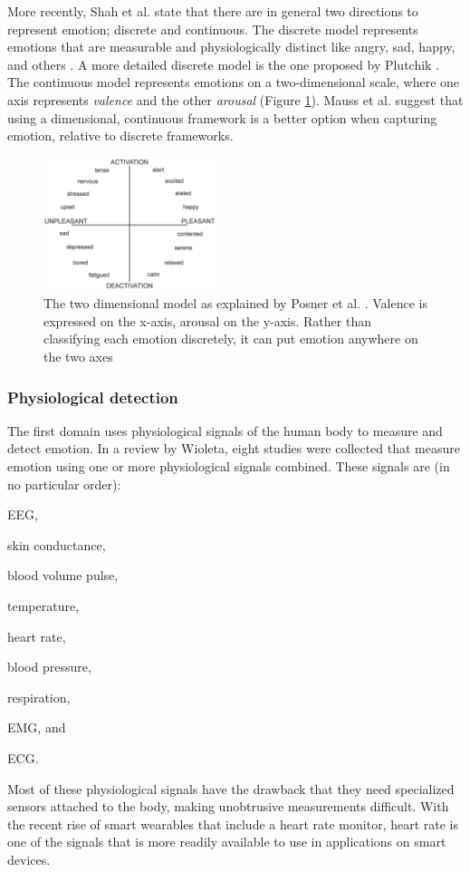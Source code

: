 \documentclass{sigchi}
\begin{document}
More recently, Shah et al. \cite{Shah2015} state that there are in general two directions to represent emotion; discrete and continuous. The discrete model represents emotions that are measurable and physiologically distinct like angry, sad, happy, and others \cite{Ekman1992}. A more detailed discrete model is the one proposed by Plutchik \cite{Plutchik1980}. The continuous model represents emotions on a two-dimensional scale, where one axis represents \textit{valence} and the other \textit{arousal} \cite{Posner2005} (Figure \ref{fig:circumplex_model}). Mauss et al. \cite{Mauss2009} suggest that using a dimensional, continuous framework is a better option when capturing emotion, relative to discrete frameworks. 

\begin{figure}[t]
    \centering
    \includegraphics[width=0.45\textwidth]{images/CircumplexModel.jpg}
    \caption{The two dimensional model as explained by Posner et al. \protect\cite{Posner2005}. Valence is expressed on the x-axis, arousal on the y-axis. Rather than classifying each emotion discretely, it can put emotion anywhere on the two axes}
    \label{fig:circumplex_model}
\end{figure}

\subsubsection{Physiological detection} %
\label{sub:physiology}
The first domain uses physiological signals of the human body to measure and detect emotion. In a review by Wioleta\cite{Wioleta2013}, eight studies were collected that measure emotion using one or more physiological signals combined. These signals are (in no particular order):
\begin{enumerate*}[label=(\alph*)]
  \item EEG,
  \item skin conductance,
  \item blood volume pulse,
  \item temperature,
  \item heart rate,
  \item blood pressure,
  \item respiration,
  \item EMG, and
  \item ECG.
\end{enumerate*}
Most of these physiological signals have the drawback that they need specialized sensors attached to the body, making unobtrusive measurements difficult. With the recent rise of smart wearables that include a heart rate monitor, heart rate is one of the signals that is more readily available to use in applications on smart devices.
\end{document}
